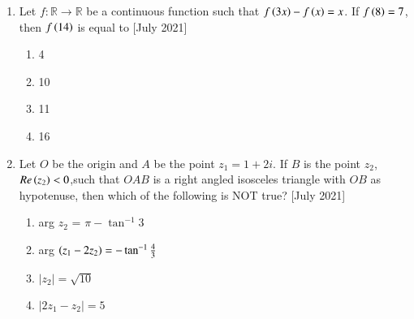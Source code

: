 \documentclass[journal]{IEEEtran}
\begin{document}
\begin{enumerate}
	\item Let $f: \mathbb{R} \rightarrow \mathbb{R}$ be a continuous function such that $f\left(3x\right) - f\left(x\right) = x$. If $f\left(8\right) = 7$, then $f\left(14\right)$ is equal to \hfill{[July 2021]}
    \begin{multicols}{2}
    \begin{enumerate}
        \item 4
        \item 10
        \item 11
        \item 16
    \end{enumerate}
     \end{multicols} 
     \item Let $O$ be the origin and $A$ be the point $z_1 = 1 + 2 i$. If $B$ is the point $z_2$, $Re\left(z_2\right) < 0$,such that $OAB$ is a right angled isosceles triangle with $OB$ as hypotenuse, then which of the following is NOT true? \hfill{[July 2021]}
     \begin{multicols}{2}
     \begin{enumerate}
         \item arg $z_2$ = $\pi - \tan^{-1}{3}$
         \item arg $\left(z_1 - 2 z_2\right) = -\tan^{-1}\frac{4}{3}$
         \item $|z_2 | = \sqrt{10}$
         \item $|2z_1 - z_2| = 5$
     \end{enumerate}
         

\end{multicols}
\end{enumerate}
\end{document}
